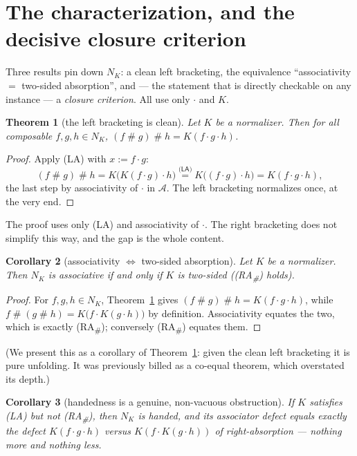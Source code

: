 \documentclass[11pt]{amsart}
\theoremstyle{plain}
\newtheorem{theorem}{Theorem}[section]
\newtheorem{corollary}[theorem]{Corollary}
\theoremstyle{definition}
\theoremstyle{remark}
\newcommand{\sh}{\mathbin{\#}}
\newcommand{\LA}{\textsf{(LA)}}
\newcommand{\RA}{\textsf{(RA}\textsubscript{\#}\textsf{)}}
\begin{document}
\section{The characterization, and the decisive closure criterion}
\label{sec:char}

Three results pin down $N_{K}$: a clean left bracketing, the equivalence ``associativity $=$
two-sided absorption'', and --- the statement that is directly checkable on any instance --- a
\emph{closure criterion}. All use only $\cdot$ and $K$.

\begin{theorem}[the left bracketing is clean]
\label{thm:A}
Let $K$ be a normalizer. Then for all composable $f,g,h\in N_{K}$,
$(f\sh g)\sh h = K(f\cdot g\cdot h)$.
\end{theorem}
\begin{proof}
Apply \LA{} with $x:=f\cdot g$:
\[
  (f\sh g)\sh h = K\big(K(f\cdot g)\cdot h\big) \overset{\LA}{=} K\big((f\cdot g)\cdot h\big)
    = K(f\cdot g\cdot h),
\]
the last step by associativity of $\cdot$ in $\mathcal{A}$. The left bracketing normalizes once, at
the very end.
\end{proof}

The proof uses only \LA{} and associativity of $\cdot$. The right bracketing does not simplify this
way, and the gap is the whole content.

\begin{corollary}[associativity $\Longleftrightarrow$ two-sided absorption]
\label{cor:B}
Let $K$ be a normalizer. Then $N_{K}$ is associative if and only if $K$ is two-sided (\RA{} holds).
\end{corollary}
\begin{proof}
For $f,g,h\in N_{K}$, Theorem~\ref{thm:A} gives $(f\sh g)\sh h=K(f\cdot g\cdot h)$, while
$f\sh(g\sh h)=K\big(f\cdot K(g\cdot h)\big)$ by definition. Associativity equates the two, which is
exactly \RA{}; conversely \RA{} equates them.
\end{proof}

(We present this as a corollary of Theorem~\ref{thm:A}: given the clean left bracketing it is pure
unfolding. It was previously billed as a co-equal theorem, which overstated its depth.)

\begin{corollary}[handedness is a genuine, non-vacuous obstruction]
\label{cor:genuine}
If $K$ satisfies \LA{} but not \RA{}, then $N_{K}$ is handed, and its associator defect equals
exactly the defect $K(f\cdot g\cdot h)$ versus $K(f\cdot K(g\cdot h))$ of right-absorption --- nothing
more and nothing less.
\end{corollary}
\end{document}
